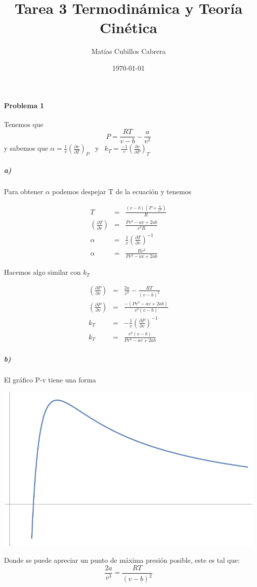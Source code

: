 \documentclass[11pt,a4paper]{article}
\begin{document}
\title{Tarea 3 Termodinámica y Teoría Cinética}
\author{Matías Cubillos Cabrera}
\date{\today}
\maketitle

\paragraph{Problema 1}

Tenemos que $$P = \frac{RT}{v - b} - \frac{a}{v^2}$$
y sabemos que $\displaystyle{\alpha=\frac{1}{v}\left(\frac{\partial v }{\partial T }\right)_P}$
\,  y \, $\displaystyle{k_T=\frac{-1}{v}\left(\frac{\partial v }{\partial P }\right)_T}$\\

\subparagraph{a)}
Para obtener $\alpha$ podemos despejar T de la ecuación y tenemos

\begin{eqnarray}
T &=& \frac{(v-b)(P+\frac{a}{v^2})}{R}\\
\left(\frac{\partial T}{\partial v}\right) &=& \frac{P v^3 - a v + 2 a b}{v^3 R}\\
\alpha &=& \frac{1}{v} \left(\frac{\partial T}{\partial v}\right)^{-1} \\
\alpha &=& \frac{R v^2}{P v^3 - a v + 2 a b}
\end{eqnarray}

Hacemos algo similar con $k_T$

\begin{eqnarray}
\left(\frac{\partial P}{\partial v}\right) &=& \frac{2 a}{v^3} - \frac{R T}{(v-b)^2} \\
\left(\frac{\partial P}{\partial v}\right) &=& \frac{-(P v^3 - a v + 2 a b)}{v^3(v-b)}\\
k_T &=& -\frac{1}{v} \left(\frac{\partial P}{\partial v}\right)^{-1}\\
k_T &=& \frac{v^2(v-b)}{P v^3 - a v + 2 a b}
\end{eqnarray}

\subparagraph{b)}
El gráfico P-v tiene una forma\\

\begin{center}
\includegraphics[scale=0.65]{GraficoPV.pdf}
\end{center}

Donde se puede apreciar un punto de máxima presión posible, este es tal que:
$$ \frac{2 a}{v^3} = \frac{R T}{(v-b)^2} $$
\end{document}
